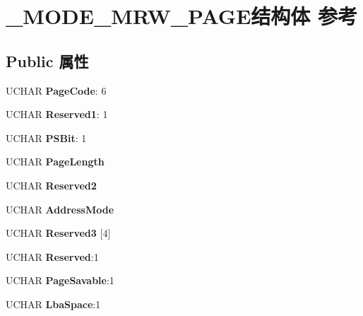 \hypertarget{struct___m_o_d_e___m_r_w___p_a_g_e}{}\section{\+\_\+\+M\+O\+D\+E\+\_\+\+M\+R\+W\+\_\+\+P\+A\+G\+E结构体 参考}
\label{struct___m_o_d_e___m_r_w___p_a_g_e}
\subsection*{Public 属性}
\begin{DoxyCompactItemize}
\item 
\mbox{\label{struct___m_o_d_e___m_r_w___p_a_g_e_a6697a7fd0f4c23c16cbdff2bdaaa5457}} 
U\+C\+H\+AR {\bfseries Page\+Code}\+: 6
\item 
\mbox{\label{struct___m_o_d_e___m_r_w___p_a_g_e_a69b5af6aae9423edf778a0bd89fc8ee1}} 
U\+C\+H\+AR {\bfseries Reserved1}\+: 1
\item 
\mbox{\label{struct___m_o_d_e___m_r_w___p_a_g_e_aa8fcf5c0cc3ac986fd86126b197dda57}} 
U\+C\+H\+AR {\bfseries P\+S\+Bit}\+: 1
\item 
\mbox{\label{struct___m_o_d_e___m_r_w___p_a_g_e_ab7aa550f4cee30c6d196e417736ea710}} 
U\+C\+H\+AR {\bfseries Page\+Length}
\item 
\mbox{\label{struct___m_o_d_e___m_r_w___p_a_g_e_a501d17623ea45c6c5dd24d58b57009bb}} 
U\+C\+H\+AR {\bfseries Reserved2}
\item 
\mbox{\label{struct___m_o_d_e___m_r_w___p_a_g_e_af864073c5c94b60bdbbdc0ead47b8805}} 
U\+C\+H\+AR {\bfseries Address\+Mode}
\item 
\mbox{\label{struct___m_o_d_e___m_r_w___p_a_g_e_a5128d5b28ab2fea1bda2ba0e9857494e}} 
U\+C\+H\+AR {\bfseries Reserved3} \mbox{[}4\mbox{]}
\item 
\mbox{\label{struct___m_o_d_e___m_r_w___p_a_g_e_aa909b8bc0946f364dd3d11f1d438798b}} 
U\+C\+H\+AR {\bfseries Reserved}\+:1
\item 
\mbox{\label{struct___m_o_d_e___m_r_w___p_a_g_e_a4b5572bf22e1ae813e57f112bff6422f}} 
U\+C\+H\+AR {\bfseries Page\+Savable}\+:1
\item 
\mbox{\label{struct___m_o_d_e___m_r_w___p_a_g_e_ae980982ace669d5cbc1bad0bc00c3dc6}} 
U\+C\+H\+AR {\bfseries Lba\+Space}\+:1
\end{DoxyCompactItemize}


